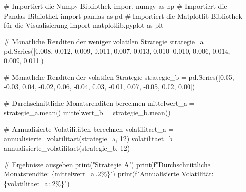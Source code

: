 \documentclass[
  ngerman,
  a4paper,
  DIV=11,
  oneside]{scrreprt}
\newenvironment{Shaded}{\begin{snugshade}}{\end{snugshade}}
\newcommand{\BuiltInTok}[1]{\textcolor[rgb]{0.00,0.23,0.31}{#1}}
\newcommand{\CommentTok}[1]{\textcolor[rgb]{0.37,0.37,0.37}{#1}}
\newcommand{\DecValTok}[1]{\textcolor[rgb]{0.68,0.00,0.00}{#1}}
\newcommand{\FloatTok}[1]{\textcolor[rgb]{0.68,0.00,0.00}{#1}}
\newcommand{\ImportTok}[1]{\textcolor[rgb]{0.00,0.46,0.62}{#1}}
\newcommand{\NormalTok}[1]{\textcolor[rgb]{0.00,0.23,0.31}{#1}}
\newcommand{\OperatorTok}[1]{\textcolor[rgb]{0.37,0.37,0.37}{#1}}
\newcommand{\SpecialCharTok}[1]{\textcolor[rgb]{0.37,0.37,0.37}{#1}}
\newcommand{\SpecialStringTok}[1]{\textcolor[rgb]{0.13,0.47,0.30}{#1}}
\newcommand{\StringTok}[1]{\textcolor[rgb]{0.13,0.47,0.30}{#1}}
\begin{document}
\begin{Shaded}
\begin{Highlighting}[]
\CommentTok{\# Importiert die Numpy{-}Bibliothek}
\ImportTok{import}\NormalTok{ numpy }\ImportTok{as}\NormalTok{ np}
\CommentTok{\# Importiert die Pandas{-}Bibliothek}
\ImportTok{import}\NormalTok{ pandas }\ImportTok{as}\NormalTok{ pd}
\CommentTok{\# Importiert die Matplotlib{-}Bibliothek für die Visualisierung}
\ImportTok{import}\NormalTok{ matplotlib.pyplot }\ImportTok{as}\NormalTok{ plt}


\CommentTok{\# Monatliche Renditen der weniger volatilen Strategie}
\NormalTok{strategie\_a }\OperatorTok{=}\NormalTok{ pd.Series([}\FloatTok{0.008}\NormalTok{, }\FloatTok{0.012}\NormalTok{, }\FloatTok{0.009}\NormalTok{, }\FloatTok{0.011}\NormalTok{, }\FloatTok{0.007}\NormalTok{, }\FloatTok{0.013}\NormalTok{, }\FloatTok{0.010}\NormalTok{, }\FloatTok{0.010}\NormalTok{, }\FloatTok{0.006}\NormalTok{, }\FloatTok{0.014}\NormalTok{, }\FloatTok{0.009}\NormalTok{, }\FloatTok{0.011}\NormalTok{])}


\CommentTok{\# Monatliche Renditen der volatilen Strategie}
\NormalTok{strategie\_b }\OperatorTok{=}\NormalTok{ pd.Series([}\FloatTok{0.05}\NormalTok{, }\OperatorTok{{-}}\FloatTok{0.03}\NormalTok{, }\FloatTok{0.04}\NormalTok{, }\OperatorTok{{-}}\FloatTok{0.02}\NormalTok{, }\FloatTok{0.06}\NormalTok{, }\OperatorTok{{-}}\FloatTok{0.04}\NormalTok{, }\FloatTok{0.03}\NormalTok{, }\OperatorTok{{-}}\FloatTok{0.01}\NormalTok{, }\FloatTok{0.07}\NormalTok{, }\OperatorTok{{-}}\FloatTok{0.05}\NormalTok{, }\FloatTok{0.02}\NormalTok{, }\FloatTok{0.00}\NormalTok{])}


\CommentTok{\# Durchschnittliche Monatsrenditen berechnen}
\NormalTok{mittelwert\_a }\OperatorTok{=}\NormalTok{ strategie\_a.mean()}
\NormalTok{mittelwert\_b }\OperatorTok{=}\NormalTok{ strategie\_b.mean()}


\CommentTok{\# Annualisierte Volatilitäten berechnen}
\NormalTok{volatilitaet\_a }\OperatorTok{=}\NormalTok{ annualisierte\_volatilitaet(strategie\_a, }\DecValTok{12}\NormalTok{)}
\NormalTok{volatilitaet\_b }\OperatorTok{=}\NormalTok{ annualisierte\_volatilitaet(strategie\_b, }\DecValTok{12}\NormalTok{)}


\CommentTok{\# Ergebnisse ausgeben}
\BuiltInTok{print}\NormalTok{(}\StringTok{"Strategie A"}\NormalTok{)}
\BuiltInTok{print}\NormalTok{(}\SpecialStringTok{f"Durchschnittliche Monatsrendite: }\SpecialCharTok{\{}\NormalTok{mittelwert\_a}\SpecialCharTok{:.2\%\}}\SpecialStringTok{"}\NormalTok{)}
\BuiltInTok{print}\NormalTok{(}\SpecialStringTok{f"Annualisierte Volatilität: }\SpecialCharTok{\{}\NormalTok{volatilitaet\_a}\SpecialCharTok{:.2\%\}}\SpecialStringTok{"}\NormalTok{)}


\end{Highlighting}
\end{Shaded}
\end{document}

